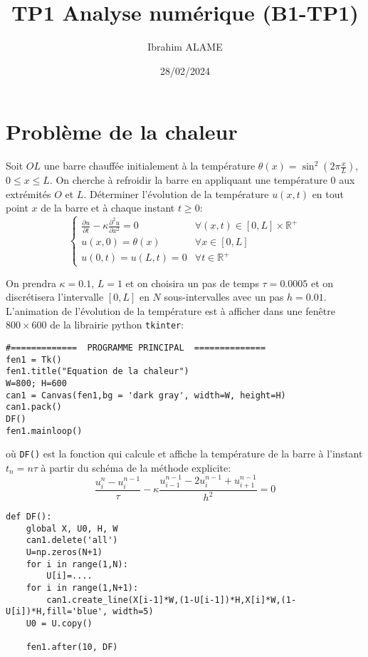 \documentclass{article}
\title{TP1 Analyse numérique (B1-TP1)}
\author{Ibrahim ALAME}
\date{28/02/2024}
\begin{document}
\maketitle

\section{Problème de la chaleur}  
 Soit $OL$ une barre chauffée initialement à la température $\theta(x)=\sin^2(2\pi \frac xL)$, $0\leq x\leq L$. On cherche à refroidir la barre en appliquant une température $0$ aux extrémités $O$ et $L$. Déterminer l'évolution de la température $u(x,t)$ en tout point $x$ de la barre et à chaque instant $t\geq 0$:
 \[\left\{\begin{array}{ll}
 \frac{\partial u}{\partial t}-\kappa \frac{\partial^2 u}{\partial x^2}=0 & \forall (x,t)\in [0,L]\times\mathbb{R}^+\\
 u(x,0)=\theta(x) & \forall x \in [0,L]\\
 u(0,t)=u(L,t)=0 & \forall t\in \mathbb{R}^+
 \end{array}\right.\]
\begin{center}
 \end{center}
On prendra $\kappa=0.1$, $L=1$ et on choisira un pas de temps $\tau=0.0005$ et on discrétisera l'intervalle $[0,L]$ en $N$ sous-intervalles avec un pas $h=0.01$. L'animation de l'évolution de la température est à afficher dans une fenêtre $800\times 600$  de la librairie python {\tt tkinter}:
\begin{verbatim}
#=============  PROGRAMME PRINCIPAL  ==============
fen1 = Tk()
fen1.title("Equation de la chaleur")
W=800; H=600
can1 = Canvas(fen1,bg = 'dark gray', width=W, height=H)
can1.pack()
DF()
fen1.mainloop()
\end{verbatim} 

où {\tt DF()} est la fonction qui calcule et affiche la température de la barre à l'instant $t_n=n\tau$ à partir du schéma de la méthode explicite:
\[\frac{u^n_i-u^{n-1}_i}{\tau}-\kappa \frac{u^{n-1}_{i-1}-2u^{n-1}_i+u^{n-1}_{i+1}}{h^2}=0\]
\begin{verbatim}
def DF():
    global X, U0, H, W
    can1.delete('all')
    U=np.zeros(N+1)
    for i in range(1,N):
        U[i]=....
    for i in range(1,N+1):
        can1.create_line(X[i-1]*W,(1-U[i-1])*H,X[i]*W,(1-U[i])*H,fill='blue', width=5)
    U0 = U.copy()

    fen1.after(10, DF)
\end{verbatim}     
\end{document}
